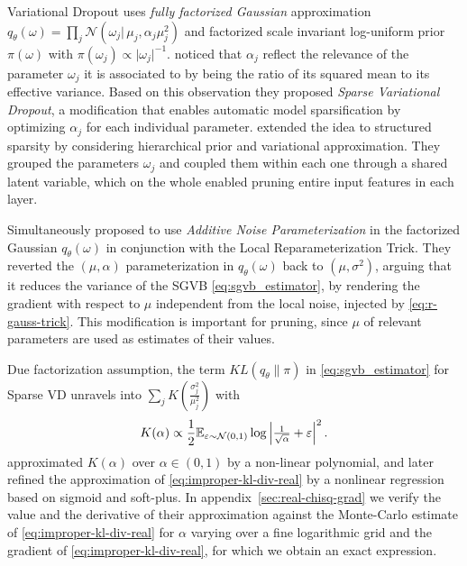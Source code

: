 \documentclass[a4paper,10pt,twocolumn]{article}
\begin{document}
Variational Dropout uses \emph{fully factorized Gaussian} approximation $
  q_\theta(\omega)
    = \prod_j \mathcal{N}(\omega_j \vert\, \mu_j, \alpha_j \mu_j^2)
$ and factorized scale invariant log-uniform prior $\pi(\omega)$ with $
  \pi(\omega_j) \propto \lvert \omega_j \rvert^{-1}
$. \citet{molchanov_variational_2017} noticed that $\alpha_j$ reflect the relevance of the
parameter $\omega_j$ it is associated to by being the ratio of its squared mean to its
effective variance. Based on this observation they proposed \emph{Sparse Variational Dropout},
a modification that enables automatic model sparsification by optimizing $\alpha_j$ for each
individual parameter. \citet{louizos_bayesian_2017} extended the idea to structured sparsity
by considering hierarchical prior and variational approximation. They grouped the parameters
$\omega_j$ and coupled them within each one through a shared latent variable, which on the
whole enabled pruning entire input features in each layer.
%

Simultaneously \citet{molchanov_variational_2017} proposed to use \emph{Additive Noise
Parameterization} in the factorized Gaussian $q_\theta(\omega)$ in conjunction with the
Local Reparameterization Trick. They reverted the $(\mu, \alpha)$ parameterization in
$q_\theta(\omega)$ back to $(\mu, \sigma^2)$, arguing that it reduces the variance of the
SGVB \eqref{eq:sgvb_estimator}, by rendering the gradient with respect to $\mu$ independent
from the local noise, injected by \eqref{eq:r-gauss-trick}. This modification is important
for pruning, since $\mu$ of relevant parameters are used as estimates of their values.

Due factorization assumption, the term $KL(q_\theta \| \pi)$ in \eqref{eq:sgvb_estimator}
for Sparse VD unravels into $
  \sum_j K(\tfrac{\sigma^2_{j}}{\mu_{j}^2})
$ with
\begin{equation}  \label{eq:improper-kl-div-real}
  K(\alpha)
    \propto \frac12 \mathbb{E}_{\varepsilon \sim \mathcal{N}(0, 1)}
        \log{\Bigl\lvert \tfrac1{\sqrt{\alpha}} + \varepsilon \Bigr\rvert^2}
  \,.
\end{equation}
\citet{kingma_variational_2015} approximated $K(\alpha)$ over $\alpha \in (0, 1)$ by
a non-linear polynomial, and later \citet{molchanov_variational_2017} refined the
approximation of \eqref{eq:improper-kl-div-real} by a nonlinear regression based on
sigmoid and soft-plus.
In appendix~\ref{sec:real-chisq-grad} we verify the value and the derivative of their
approximation against the Monte-Carlo estimate of \eqref{eq:improper-kl-div-real} for
$\alpha$ varying over a fine logarithmic grid and the gradient of \eqref{eq:improper-kl-div-real},
for which we obtain an exact expression.
\end{document}
